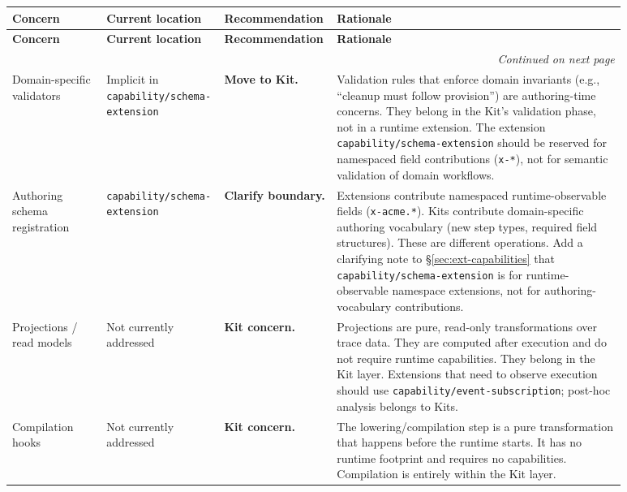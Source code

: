 \begin{longtable}{p{0.15\linewidth}p{0.13\linewidth}p{0.14\linewidth}p{0.46\linewidth}}
\toprule
\textbf{Concern} & \textbf{Current location} & \textbf{Recommendation} & \textbf{Rationale} \\
\midrule
\endfirsthead

\toprule
\textbf{Concern} & \textbf{Current location} & \textbf{Recommendation} & \textbf{Rationale} \\
\midrule
\endhead

\midrule
\multicolumn{4}{r}{\footnotesize\itshape Continued on next page} \\
\bottomrule
\endfoot

\bottomrule
\endlastfoot

Domain-specific validators &
  Implicit in \texttt{capability/\allowbreak schema-extension} &
  \textbf{Move to Kit.} &
  Validation rules that enforce domain invariants (e.g., ``cleanup must follow
  provision'') are authoring-time concerns.  They belong in the Kit's validation
  phase, not in a runtime extension.  The extension
  \texttt{capability/\allowbreak schema-extension} should be reserved for namespaced
  field contributions (\texttt{x-*}), not for semantic validation of domain
  workflows. \\

Authoring schema registration &
  \texttt{capability/\allowbreak schema-extension} &
  \textbf{Clarify boundary.} &
  Extensions contribute namespaced runtime-observable fields (\texttt{x-acme.*}).
  Kits contribute domain-specific authoring vocabulary (new step types, required
  field structures).  These are different operations.  Add a clarifying note to
  \S\ref{sec:ext-capabilities} that \texttt{capability/\allowbreak schema-extension} is
  for runtime-observable namespace extensions, not for authoring-vocabulary
  contributions. \\

Projections / read models &
  Not currently addressed &
  \textbf{Kit concern.} &
  Projections are pure, read-only transformations over trace data.  They are
  computed after execution and do not require runtime capabilities.  They belong
  in the Kit layer.  Extensions that need to observe execution should use
  \texttt{capability/\allowbreak event-subscription}; post-hoc analysis belongs to
  Kits. \\

Compilation hooks &
  Not currently addressed &
  \textbf{Kit concern.} &
  The lowering/compilation step is a pure transformation that happens before the
  runtime starts.  It has no runtime footprint and requires no capabilities.
  Compilation is entirely within the Kit layer. \\


\end{longtable}
